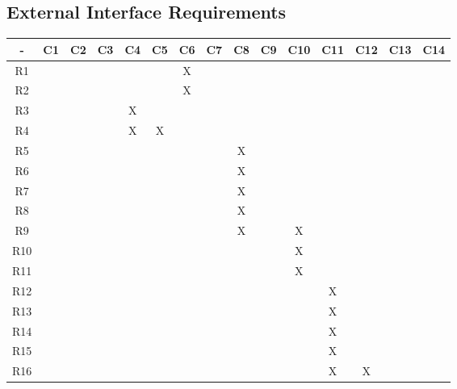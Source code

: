 	\subsection {External Interface Requirements}
	\begin{table}[H]
\begin{tabular}{|c|c|c|c|c|c|c|c|c|c|c|c|c|c|c|}
\hline
-         & C1 & C2 & C3 & C4 & C5 & C6 & C7 & C8 & C9 & C10 & C11 & C12 & C13 & C14 \\ \hline
R1        &    &    &    &    &    & X  &    &    &    &     &     &     &     &     \\ \hline
R2        &    &    &    &    &    & X  &    &    &    &     &     &     &     &     \\ \hline
R3        &    &    &    & X  &    &    &    &    &    &     &     &     &     &     \\ \hline
R4        &    &    &    & X  & X  &    &    &    &    &     &     &     &     &     \\ \hline
R5        &    &    &    &    &    &    &    & X  &    &     &     &     &     &     \\ \hline
R6        &    &    &    &    &    &    &    & X  &    &     &     &     &     &     \\ \hline
R7        &    &    &    &    &    &    &    & X  &    &     &     &     &     &     \\ \hline
R8        &    &    &    &    &    &    &    & X  &    &     &     &     &     &     \\ \hline
R9        &    &    &    &    &    &    &    & X  &    & X   &     &     &     &     \\ \hline
R10       &    &    &    &    &    &    &    &    &    & X   &     &     &     &     \\ \hline
R11       &    &    &    &    &    &    &    &    &    & X   &     &     &     &     \\ \hline
R12       &    &    &    &    &    &    &    &    &    &     & X   &     &     &     \\ \hline
R13       &    &    &    &    &    &    &    &    &    &     & X   &     &     &     \\ \hline
R14       &    &    &    &    &    &    &    &    &    &     & X   &     &     &     \\ \hline
R15       &    &    &    &    &    &    &    &    &    &     & X   &     &     &     \\ \hline
R16  &    &    &    &    &    &    &    &    &    &     & X   & X   &     &     \\ \hline

\end{tabular}
\end{table}
